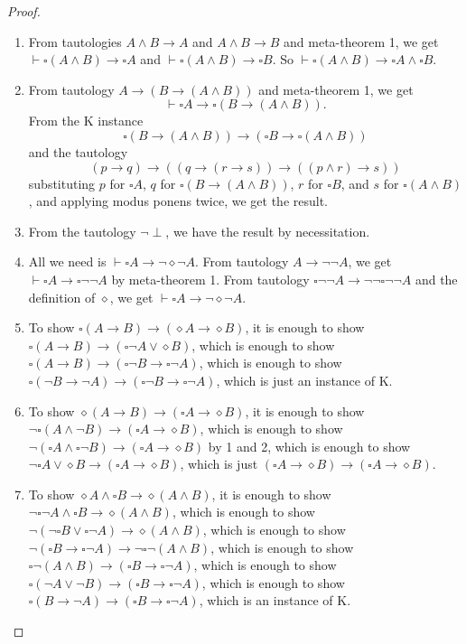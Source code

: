 \documentclass[12pt]{article}
\begin{document}
\begin{proof}
\begin{enumerate}
\item From tautologies $A\land B \to A$ and $A\land B\to B$ and meta-theorem 1, we get $\vdash \square (A\land B)\to \square A$ and $\vdash \square (A\land B)\to \square B$.  So $\vdash \square (A\land B)\to \square A \land \square B$.
\item From tautology $A\to (B\to (A\land B))$ and meta-theorem 1, we get $$\vdash \square A \to \square (B\to (A\land B)).$$  From the K instance $$\square (B\to (A\land B)) \to (\square B\to \square(A\land B))$$ and the tautology
$$(p\to q) \to ((q\to (r\to s)) \to ((p \land r) \to s))$$ substituting $p$ for $\square A$, $q$ for $\square (B\to (A\land B))$, $r$ for $\square B$, and $s$ for $\square(A\land B)$, and applying modus ponens twice, we get the result.
\item From the tautology $\neg \perp$, we have the result by necessitation.
\item All we need is $\vdash \square A \to \neg \diamond \neg A$.  From tautology $A\to \neg \neg A$, we get $\vdash \square A \to \square \neg \neg A$ by meta-theorem 1.  From tautology $\square \neg \neg A \to \neg \neg \square \neg \neg A$ and the definition of $\diamond$, we get $\vdash \square A \to \neg \diamond \neg A$.
\item
To show $\square (A\to B)\to (\diamond A \to \diamond B)$, it is enough to show $\square (A\to B)\to (\square \neg A \lor \diamond B)$, which is enough to show $\square (A\to B)\to (\square \neg B\to \square \neg A)$, which is enough to show $\square (\neg B\to \neg A)\to (\square \neg B\to \square \neg A)$, which is just an instance of K.
\item
To show $\diamond (A\to B)\to (\square A \to \diamond B)$, it is enough to show $\neg \square (A\land \neg B) \to (\square A\to \diamond B)$, which is enough to show $\neg (\square A \land \square \neg B) \to (\square A\to \diamond B)$ by 1 and 2, which is enough to show $\neg \square A \lor \diamond B \to (\square A \to \diamond B)$, which is just $(\square A \to \diamond B) \to (\square A\to \diamond B)$.
\item
To show $\diamond A \land \square B \to \diamond (A\land B)$, it is enough to show $\neg \square \neg A \land \square B \to \diamond (A\land B)$, which is enough to show $\neg (\neg \square B\lor \square \neg A) \to \diamond (A\land B)$, which is enough to show $\neg (\square B\to \square \neg A) \to \neg \square \neg (A \land B)$, which is enough to show $\square \neg (A\land B) \to (\square B\to \square \neg A)$, which is enough to show $\square (\neg A\lor \neg B) \to (\square B\to \square \neg A)$, which is enough to show $\square (B\to \neg A)\to (\square B\to \square \neg A)$, which is an instance of K.

\end{enumerate}
\end{proof}
\end{document}
